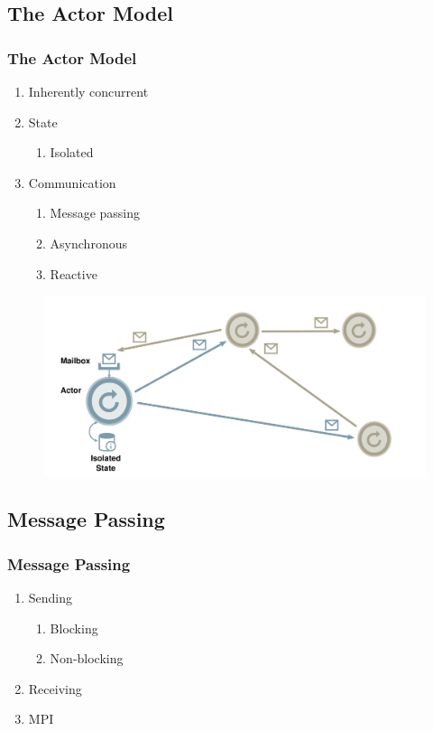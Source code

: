 \subsection{The Actor Model}
\begin{frame}
  \frametitle{The Actor Model}
  \begin{enumerate}
    \item Inherently concurrent
    \item State
    \begin{enumerate}
      \item Isolated
    \end{enumerate}
    \item Communication
    \begin{enumerate}
      \item Message passing
      \item Asynchronous
      \item Reactive
    \end{enumerate}
  \end{enumerate}
  \begin{figure}[htbp]
  \centering
  \includegraphics[width=\textwidth]{Images/actors.pdf}
\end{figure}
\end{frame}

\subsection{Message Passing}
\begin{frame}
  \frametitle{Message Passing}
  \begin{enumerate}
    \item Sending
    \begin{enumerate}
      \item Blocking
      \item Non-blocking
    \end{enumerate}
    \item Receiving
    \item MPI
  \end{enumerate}
\end{frame}
